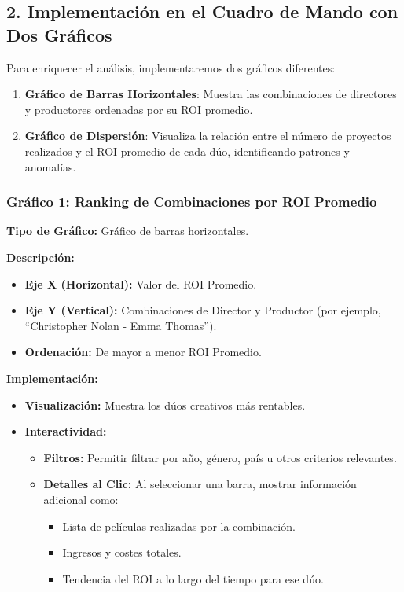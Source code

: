 \documentclass[11pt]{opticajnl}
\begin{document}
\subsection{2. Implementación en el Cuadro de Mando con Dos Gráficos}

Para enriquecer el análisis, implementaremos dos gráficos diferentes:

\begin{enumerate}
    \item \textbf{Gráfico de Barras Horizontales}: Muestra las combinaciones de directores y productores ordenadas por su ROI promedio.
    \item \textbf{Gráfico de Dispersión}: Visualiza la relación entre el número de proyectos realizados y el ROI promedio de cada dúo, identificando patrones y anomalías.
\end{enumerate}

\subsubsection{Gráfico 1: Ranking de Combinaciones por ROI Promedio}

\textbf{Tipo de Gráfico:} Gráfico de barras horizontales.

\textbf{Descripción:}

\begin{itemize}
    \item \textbf{Eje X (Horizontal):} Valor del ROI Promedio.
    \item \textbf{Eje Y (Vertical):} Combinaciones de Director y Productor (por ejemplo, ``Christopher Nolan - Emma Thomas'').
    \item \textbf{Ordenación:} De mayor a menor ROI Promedio.
\end{itemize}

\textbf{Implementación:}

\begin{itemize}
    \item \textbf{Visualización:} Muestra los dúos creativos más rentables.
    \item \textbf{Interactividad:}
    \begin{itemize}
        \item \textbf{Filtros:} Permitir filtrar por año, género, país u otros criterios relevantes.
        \item \textbf{Detalles al Clic:} Al seleccionar una barra, mostrar información adicional como:
        \begin{itemize}
            \item Lista de películas realizadas por la combinación.
            \item Ingresos y costes totales.
            \item Tendencia del ROI a lo largo del tiempo para ese dúo.
        \end{itemize}
    \end{itemize}
\end{itemize}
\end{document}
